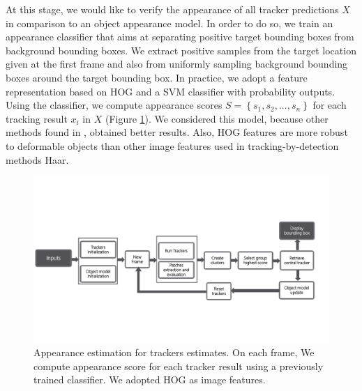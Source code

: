 At this stage, we would like to verify the appearance of all tracker
predictions $X$ in comparison to an object appearance model.
In order to do so, we train an appearance classifier that aims at separating
positive target bounding boxes from background bounding boxes.
We extract positive samples from the target location given at the first frame
and also from uniformly sampling background bounding boxes around the target
bounding box.
In practice, we adopt a feature representation based on HOG and a SVM
classifier with probability outputs.
Using the classifier, we compute appearance scores  
$S = \left \{ s_1, s_2, ..., s_n \right \}$ for each tracking result $x_i$ in
$X$ (Figure \ref{fig::svm_app}). We considered this model, because other methods found in 
\cite{zhang2014meem,Bai2013}, obtained better results. Also, HOG features are
more robust to deformable objects than other image features used in
tracking-by-detection methods \eg Haar.

\begin{figure}[b!]
\centering
\includegraphics[page=5, width=1\linewidth, trim= 0.4cm 5.5cm 0cm 5cm,
                 clip=true]{Figures/global_diagram}
\caption[Appearance estimation for trackers estimates.]
        {\small Appearance estimation for trackers estimates. On each frame,
        We compute appearance score for each tracker result using a previously
        trained classifier. We adopted HOG as image features.}
\label{fig::svm_app}
\end{figure}


